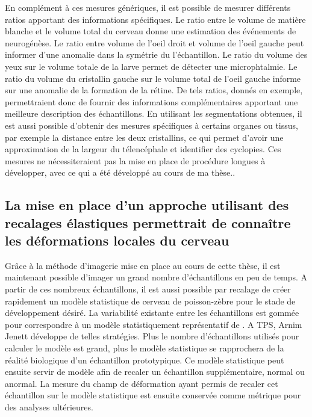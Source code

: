 \documentclass[\main/main.tex]{subfiles}
\begin{document}
En complément à ces mesures génériques, il est possible de mesurer différents ratios apportant des informations spécifiques. Le ratio entre le volume de matière blanche et le volume total du cerveau donne une estimation des événements de neurogénèse. Le ratio entre volume de l'oeil droit et volume de l'oeil gauche peut informer d'une anomalie dans la symétrie du l'échantillon. Le ratio du volume des yeux sur le volume totale de la larve permet de détecter une microphtalmie.
Le ratio du volume du cristallin gauche sur le volume total de l'oeil gauche informe sur une anomalie de la formation de la rétine.
%
De tels ratios, donnés en exemple, permettraient donc de fournir des informations complémentaires apportant une meilleure description des échantillons.
En utilisant les segmentations obtenues, il est aussi possible d'obtenir des mesures spécifiques à certains organes ou tissus, par exemple la distance entre les deux cristallins, ce qui permet d'avoir une approximation de la largeur du télencéphale et identifier des cyclopies.
Ces mesures ne nécessiteraient pas la mise en place de procédure longues à développer, avec ce qui a été développé au cours de ma thèse..

    \subsection{La mise en place d'un approche utilisant des recalages élastiques permettrait de connaître les déformations locales du cerveau}
    
Grâce à la méthode d'imagerie mise en place au cours de cette thèse,
il est maintenant possible d'imager un grand nombre d'échantillons en peu de temps. A partir de ces nombreux échantillons, il est aussi possible par recalage de créer rapidement un modèle statistique de cerveau de poisson-zèbre pour le stade de développement désiré. La variabilité existante entre les échantillons est gommée pour correspondre à un modèle statistiquement représentatif de \pz.
A TPS, Arnim Jenett développe de telles stratégies.%
Plus le nombre d'échantillons utilisés pour calculer le modèle est grand, plus le modèle statistique se rapprochera de la réalité biologique d'un échantillon prototypique.
%
Ce modèle statistique peut ensuite servir de modèle afin de recaler un échantillon supplémentaire, normal ou anormal. La mesure du champ de déformation ayant permis de recaler cet échantillon sur le modèle statistique est ensuite conservée comme métrique pour des analyses ultérieures.
\end{document}
